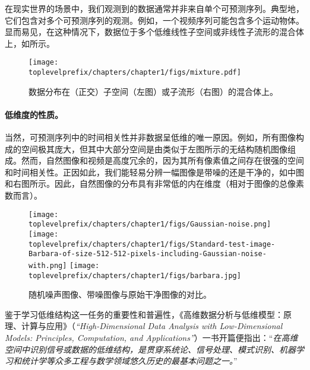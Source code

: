 \documentclass[../../book-main.tex]{subfiles}
\begin{document}
在现实世界的场景中，我们观测到的数据通常并非来自单个可预测序列。典型地，它们包含对多个可预测序列的观测。例如，一个视频序列可能包含多个运动物体。显而易见，在这种情况下，数据位于多个低维线性子空间或非线性子流形的混合体上，如所示。
\begin{figure}
    \centering
    \texttt{[image: \\toplevelprefix/chapters/chapter1/figs/mixture.pdf]}
    \caption{数据分布在（正交）子空间（左图）或子流形（右图）的混合体上。}
    \label{fig:mixture-models}
\end{figure}

\paragraph{低维度的性质。}
当然，可预测序列中的时间相关性并非数据呈低维的唯一原因。例如，所有图像构成的空间极其庞大，但其中大部分空间是由类似于左图所示的无结构随机图像组成。然而，自然图像和视频是高度冗余的，因为其所有像素值之间存在很强的空间和时间相关性。正因如此，我们能轻易分辨一幅图像是带噪的还是干净的，如中图和右图所示。因此，自然图像的分布具有非常低的内在维度（相对于图像的总像素数而言）。

\begin{figure}
    \centering
    \texttt{[image: \\toplevelprefix/chapters/chapter1/figs/Gaussian-noise.png]}\hspace{2mm} 
    \texttt{[image: \\toplevelprefix/chapters/chapter1/figs/Standard-test-image-Barbara-of-size-512-512-pixels-including-Gaussian-noise-with.png]} \hspace{2mm} 
    \texttt{[image: \\toplevelprefix/chapters/chapter1/figs/barbara.jpg]}
    \caption{随机噪声图像、带噪图像与原始干净图像的对比。%
    }
    \label{fig:noise-image}
\end{figure}

鉴于学习低维结构这一任务的重要性和普遍性，《高维数据分析与低维模型：原理、计算与应用》（{\em ``High-Dimensional Data Analysis with Low-Dimensional Models: Principles, Computation, and Applications''}）\cite{Wright-Ma-2022}一书开篇便指出：``{\em 在高维空间中识别信号或数据的低维结构，是贯穿系统论、信号处理、模式识别、机器学习和统计学等众多工程与数学领域悠久历史的最基本问题之一。}''
\end{document}
